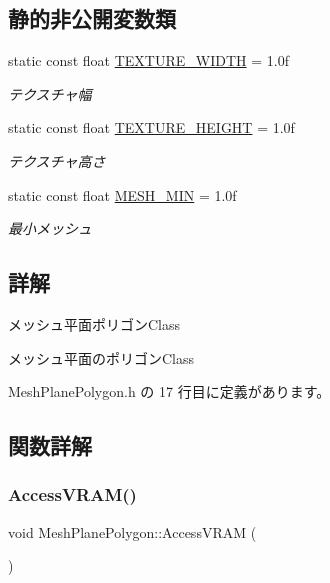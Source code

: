 \subsection*{静的非公開変数類}
\begin{DoxyCompactItemize}
\item 
static const float \mbox{\hyperlink{class_mesh_plane_polygon_ac30b8ea1330653ced246f68593fbe827}{T\+E\+X\+T\+U\+R\+E\+\_\+\+W\+I\+D\+TH}} = 1.\+0f
\begin{DoxyCompactList}\small\item\em テクスチャ幅 \end{DoxyCompactList}\item 
static const float \mbox{\hyperlink{class_mesh_plane_polygon_a749c198188d680d6e6daedc280b12e4e}{T\+E\+X\+T\+U\+R\+E\+\_\+\+H\+E\+I\+G\+HT}} = 1.\+0f
\begin{DoxyCompactList}\small\item\em テクスチャ高さ \end{DoxyCompactList}\item 
static const float \mbox{\hyperlink{class_mesh_plane_polygon_a2351cd772fd52db85d339acc35f5acf8}{M\+E\+S\+H\+\_\+\+M\+IN}} = 1.\+0f
\begin{DoxyCompactList}\small\item\em 最小メッシュ \end{DoxyCompactList}\end{DoxyCompactItemize}


\subsection{詳解}
メッシュ平面ポリゴン\+Class 

メッシュ平面のポリゴン\+Class 

 Mesh\+Plane\+Polygon.\+h の 17 行目に定義があります。



\subsection{関数詳解}
\mbox{\label{class_mesh_plane_polygon_a30fd785154d01644ba76165673c5a7ac}} 
\subsubsection{\texorpdfstring{Access\+V\+R\+A\+M()}{AccessVRAM()}}
{\footnotesize\ttfamily void Mesh\+Plane\+Polygon\+::\+Access\+V\+R\+AM (\begin{DoxyParamCaption}{ }\end{DoxyParamCaption})\hspace{0.3cm}{\ttfamily [private]}}



